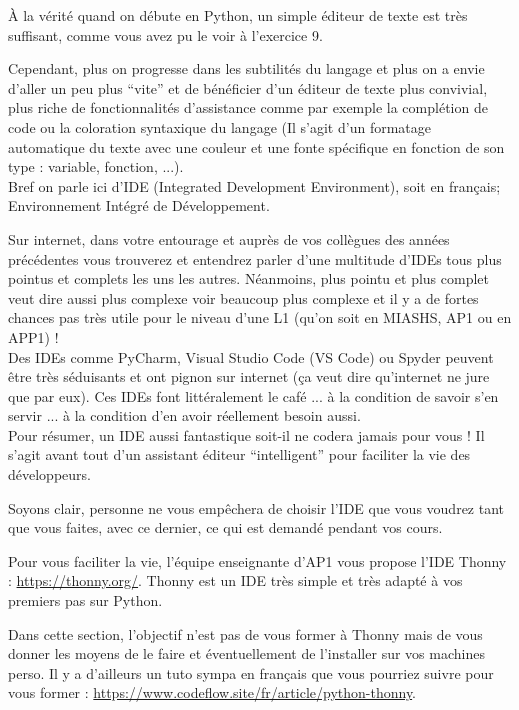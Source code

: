 \documentclass{article}
\begin{document}
À la vérité quand on débute en Python, un simple éditeur de texte est très suffisant, comme vous avez pu le voir à l'exercice 9. 

Cependant, plus on progresse dans les subtilités du langage et plus on a envie d'aller un peu plus ``vite'' et de bénéficier d'un éditeur de texte plus convivial, plus riche de fonctionnalités d'assistance comme par exemple la complétion de code ou la coloration syntaxique du langage (Il s'agit d'un formatage automatique du texte avec une couleur et une fonte spécifique en fonction de son type : variable, fonction, ...). \\
Bref on parle ici d'IDE (Integrated Development Environment), soit en fran\c cais; Environnement Intégré de Développement.

Sur internet, dans votre entourage et auprès de vos collègues des années précédentes vous trouverez et entendrez parler d'une multitude d'IDEs tous plus pointus et complets les uns les autres. Néanmoins, plus pointu et plus complet veut dire aussi plus complexe voir beaucoup plus complexe et il y a de fortes chances pas très utile pour le niveau d'une L1 (qu'on soit en MIASHS, AP1 ou en APP1) ! \\
Des IDEs comme PyCharm, Visual Studio Code (VS Code) ou Spyder peuvent être très séduisants et ont pignon sur internet (\c ca veut dire qu'internet ne jure que par eux). Ces IDEs font littéralement le café ... à la condition de savoir s'en servir ... à la condition d'en avoir réellement besoin aussi. \\
Pour résumer, un IDE aussi fantastique soit-il ne codera jamais pour vous ! Il s'agit avant tout d'un assistant éditeur ``intelligent'' pour faciliter la vie des développeurs. 

Soyons clair, personne ne vous empêchera de choisir l'IDE que vous voudrez tant que vous faites, avec ce dernier, ce qui est demandé pendant vos cours.


Pour vous faciliter la vie, l'équipe enseignante d'AP1 vous propose l'IDE Thonny : \url{https://thonny.org/}. Thonny est un IDE très simple et très adapté à vos premiers pas sur Python. 

Dans cette section, l'objectif n'est pas de vous former à Thonny mais de vous donner les moyens de le faire et éventuellement de l'installer sur vos machines perso. Il y a d'ailleurs un tuto sympa en fran\c cais que vous pourriez suivre pour vous former : \url{https://www.codeflow.site/fr/article/python-thonny}.
\end{document}
